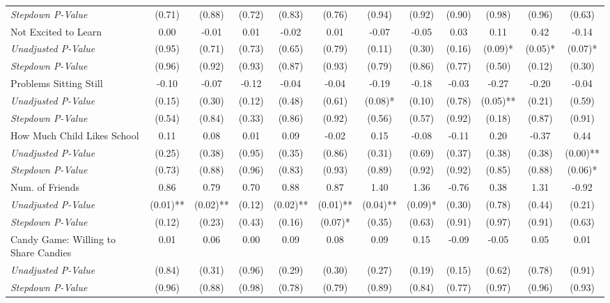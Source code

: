 \begin{tabular}{l c c c c c c c c c c c}
\quad \textit{Stepdown P-Value} & (0.71) & (0.88) & (0.72) & (0.83) & (0.76) & (0.94) & (0.92) & (0.90) & (0.98) & (0.96) & (0.63) \\
Not Excited to Learn & 0.00 & -0.01 & 0.01 & -0.02 & 0.01 & -0.07 & -0.05 & 0.03 & 0.11 & 0.42 & -0.14 \\
\quad \textit{Unadjusted P-Value} & (0.95) & (0.71) & (0.73) & (0.65) & (0.79) & (0.11) & (0.30) & (0.16) & (0.09)* & (0.05)* & (0.07)* \\
\quad \textit{Stepdown P-Value} & (0.96) & (0.92) & (0.93) & (0.87) & (0.93) & (0.79) & (0.86) & (0.77) & (0.50) & (0.12) & (0.30) \\
Problems Sitting Still & -0.10 & -0.07 & -0.12 & -0.04 & -0.04 & -0.19 & -0.18 & -0.03 & -0.27 & -0.20 & -0.04 \\
\quad \textit{Unadjusted P-Value} & (0.15) & (0.30) & (0.12) & (0.48) & (0.61) & (0.08)* & (0.10) & (0.78) & (0.05)** & (0.21) & (0.59) \\
\quad \textit{Stepdown P-Value} & (0.54) & (0.84) & (0.33) & (0.86) & (0.92) & (0.56) & (0.57) & (0.92) & (0.18) & (0.87) & (0.91) \\
How Much Child Likes School & 0.11 & 0.08 & 0.01 & 0.09 & -0.02 & 0.15 & -0.08 & -0.11 & 0.20 & -0.37 & 0.44 \\
\quad \textit{Unadjusted P-Value} & (0.25) & (0.38) & (0.95) & (0.35) & (0.86) & (0.31) & (0.69) & (0.37) & (0.38) & (0.38) & (0.00)** \\
\quad \textit{Stepdown P-Value} & (0.73) & (0.88) & (0.96) & (0.83) & (0.93) & (0.89) & (0.92) & (0.92) & (0.85) & (0.88) & (0.06)* \\
Num. of Friends & 0.86 & 0.79 & 0.70 & 0.88 & 0.87 & 1.40 & 1.36 & -0.76 & 0.38 & 1.31 & -0.92 \\
\quad \textit{Unadjusted P-Value} & (0.01)** & (0.02)** & (0.12) & (0.02)** & (0.01)** & (0.04)** & (0.09)* & (0.30) & (0.78) & (0.44) & (0.21) \\
\quad \textit{Stepdown P-Value} & (0.12) & (0.23) & (0.43) & (0.16) & (0.07)* & (0.35) & (0.63) & (0.91) & (0.97) & (0.91) & (0.63) \\
Candy Game: Willing to Share Candies & 0.01 & 0.06 & 0.00 & 0.09 & 0.08 & 0.09 & 0.15 & -0.09 & -0.05 & 0.05 & 0.01 \\
\quad \textit{Unadjusted P-Value} & (0.84) & (0.31) & (0.96) & (0.29) & (0.30) & (0.27) & (0.19) & (0.15) & (0.62) & (0.78) & (0.91) \\
\quad \textit{Stepdown P-Value} & (0.96) & (0.88) & (0.98) & (0.78) & (0.79) & (0.89) & (0.84) & (0.77) & (0.97) & (0.96) & (0.93) \\
\bottomrule
\end{tabular}
